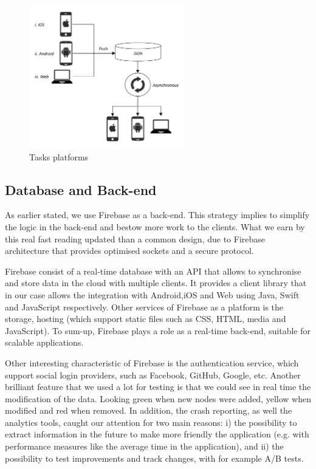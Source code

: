 \begin{figure}[ht]
\centering
\includegraphics[width=0.6\textwidth]{figs/Architecture}
	\caption{Tasks platforms}
	\label{fig:Architecture}
\end{figure}


\subsection{Database and Back-end}

As earlier stated, we use Firebase as a back-end. This strategy implies to simplify the logic in the back-end and bestow more work to the clients. What we earn by this real fast reading updated than a common design, due to Firebase architecture that provides optimised sockets and a secure protocol.

Firebase consist of a real-time database with an API that allows to synchronise and store data in the cloud with multiple clients. It provides a client library that in our case allows the integration with Android,iOS and Web using Java, Swift and JavaScript respectively. Other services of Firebase as a platform is the storage, hosting (which support static files such as CSS, HTML, media and JavaScript).  To sum-up, Firebase plays a role as a real-time back-end, suitable for scalable applications.

Other interesting characteristic of Firebase is the authentication service, which support social login providers, such as Facebook, GitHub, Google, etc. Another brilliant feature that we used a lot for testing is that we could see in real time the modification of the data. Looking green when new nodes were added, yellow when modified and red when removed. In addition, the crash reporting, as well the analytics tools, caught our attention for two main reasons: i) the possibility to extract information in the future to make more friendly the application (e.g. with performance measures like the average time in the application), and ii) the possibility to test improvements and track changes, with for example A/B tests.

